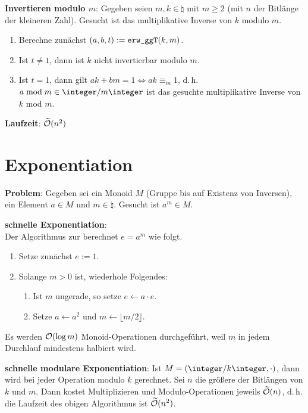 \linie

\textbf{Invertieren modulo $m$}:
Gegeben seien $m, k \in \natural$ mit $m \ge 2$ (mit $n$ der Bitlänge der kleineren Zahl).
Gesucht ist das multiplikative Inverse von $k$ modulo $m$.
\begin{enumerate}
    \item
    Berechne zunächst $(a, b, t) := \texttt{erw\_ggT}(k, m)$.

    \item
    Ist $t \not= 1$, dann ist $k$ nicht invertierbar modulo $m$.

    \item
    Ist $t = 1$, dann gilt $ak + bm = 1 \iff ak \equiv_m 1$,
    d.\,h. $a \bmod m \in \ZmZ$ ist das gesuchte multiplikative Inverse von $k$ mod $m$.
\end{enumerate}

\textbf{Laufzeit}:
$\widetilde{\mathcal{O}}(n^2)$

\pagebreak

\section{%
    Exponentiation%
}

\textbf{Problem}:
Gegeben sei ein Monoid $M$ (Gruppe bis auf Existenz von Inversen), ein Element $a \in M$ und
$m \in \natural$.
Gesucht ist $a^m \in M$.

\textbf{schnelle Exponentiation}:\\
Der Algorithmus zur  berechnet $e = a^m$ wie folgt.
\begin{enumerate}
    \item
    Setze zunächst $e := 1$.

    \item
    Solange $m > 0$ ist, wiederhole Folgendes:
    \begin{enumerate}
        \item
        Ist $m$ ungerade, so setze $e \leftarrow a \cdot e$.

        \item
        Setze $a \leftarrow a^2$ und $m \leftarrow \lfloor m/2\rfloor$.
    \end{enumerate}
\end{enumerate}
Es werden $\mathcal{O}(\log m)$ Monoid-Operationen durchgeführt,
weil $m$ in jedem Durchlauf mindestens halbiert wird.

\textbf{schnelle modulare Exponentiation}:
Ist $M = (\ZkZ, \cdot)$, dann wird bei jeder Operation modulo $k$ gerechnet.
Sei $n$ die größere der Bitlängen von $k$ und $m$.
Dann kostet Multiplizieren und Modulo-Operationen jeweils $\widetilde{\mathcal{O}}(n)$,
d.\,h. die Laufzeit des obigen Algorithmus ist $\widetilde{\mathcal{O}}(n^2)$.

